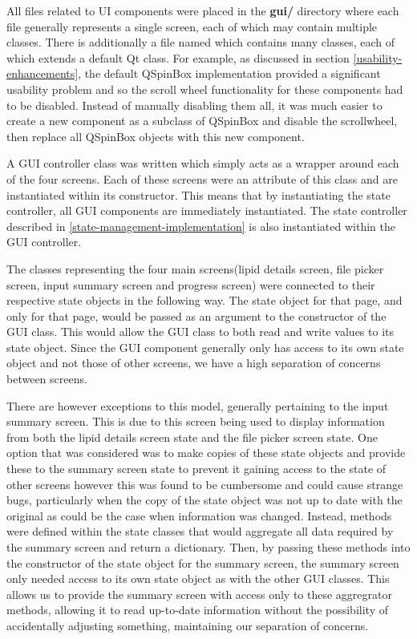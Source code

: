 \documentclass{l4proj}
\begin{document}
All files related to UI components were placed in the \textbf{gui/} directory where each file generally represents a single screen, each of which may contain multiple classes. There is additionally a file named  which contains many classes, each of which extends a default Qt class. For example, as discussed in section \ref{usability-enhancements}, the default QSpinBox implementation provided a significant usability problem and so the scroll wheel functionality for these components had to be disabled. Instead of manually disabling them all, it was much easier to create a new component as a subclass of QSpinBox and disable the scrollwheel, then replace all QSpinBox objects with this new component.

A GUI controller class was written which simply acts as a wrapper around each of the four screens. Each of these screens were an attribute of this class and are instantiated within its constructor. This means that by instantiating the state controller, all GUI components are immediately instantiated. The state controller described in \ref{state-management-implementation} is also instantiated within the GUI controller.

The classes representing the four main screens(lipid details screen, file picker screen, input summary screen and progress screen) were connected to their respective state objects in the following way. The state object for that page, and only for that page, would be passed as an argument to the constructor of the GUI class. This would allow the GUI class to both read and write values to its state object. Since the GUI component generally only has access to its own state object and not those of other screens, we have a high separation of concerns between screens.

There are however exceptions to this model, generally pertaining to the input summary screen. This is due to this screen being used to display information from both the lipid details screen state and the file picker screen state. One option that was considered was to make copies of these state objects and provide these to the summary screen state to prevent it gaining access to the state of other screens however this was found to be cumbersome and could cause strange bugs, particularly when the copy of the state object was not up to date with the original as could be the case when information was changed. Instead, methods were defined within the state classes that would aggregate all data required by the summary screen and return a dictionary. Then, by passing these methods into the constructor of the state object for the summary screen, the summary screen only needed access to its own state object as with the other GUI classes. This allows us to provide the summary screen with access only to these aggregrator methods, allowing it to read up-to-date information without the possibility of accidentally adjusting something, maintaining our separation of concerns.
\end{document}
